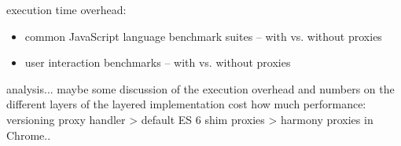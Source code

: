 execution time overhead:
\begin{itemize}
    \item common JavaScript language benchmark suites – with vs. without proxies
    \item user interaction benchmarks – with vs. without proxies
\end{itemize}


analysis...
maybe some discussion of the execution overhead and numbers on the different layers of the layered implementation cost how much performance: versioning proxy handler > default ES 6 shim proxies > harmony proxies in Chrome..



